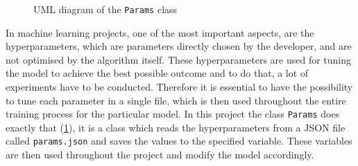 \begin{figure}[htbp]
{
    }
	\caption{UML diagram of the \texttt{Params} class}
	\label{fig:UML-Params}
\end{figure}
\noindent
In machine learning projects, one of the most important aspects, are the hyperparameters, which are parameters directly chosen by the developer, and are not optimised by the algorithm itself. These hyperparameters are used for tuning the model to achieve the best possible outcome and to do that, a lot of experiments have to be conducted. Therefore it is essential to have the possibility to tune each parameter in a single file, which is then used throughout the entire training process for the particular model. In this project the class \texttt{Params} does exactly that (\ref{fig:UML-Params}), it is a class which reads the hyperparameters from a JSON file called \texttt{params.json} and saves the values to the specified variable. These variables are then used throughout the project and modify the model accordingly.


